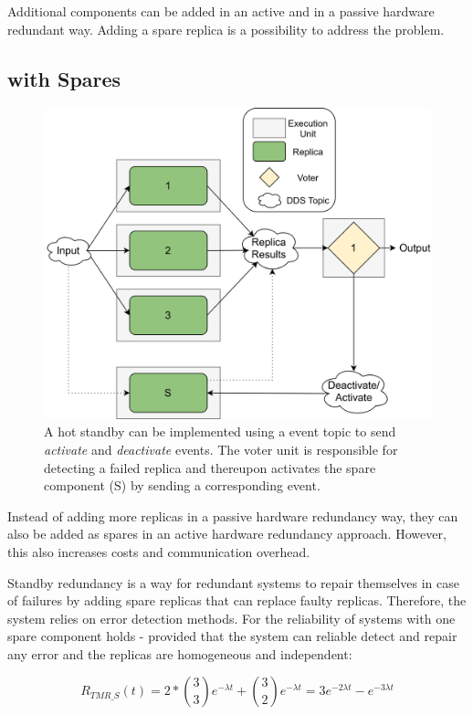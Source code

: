 Additional components can be added in an active and in a passive hardware redundant way.
Adding a spare replica is a possibility to address the \ChallengeWR problem.

\subsection{ with Spares}
\begin{figure}[!hb]
	\centering
	\includegraphics[width=0.8\linewidth]{images/TMRWithSparesDDS}
	\caption{A hot standby can be implemented using a  event topic to send \textit{activate} and \textit{deactivate} events. The voter unit is responsible for detecting a failed replica and thereupon activates the spare component (S) by sending a corresponding event.}
	\label{fig:TMRWithSparesDDS}
\end{figure}

Instead of adding more replicas in a passive hardware redundancy way, they can also be added as spares in an active hardware redundancy approach.
However, this also increases costs and communication overhead.

Standby redundancy is a way for redundant systems to repair themselves in case of failures by adding spare replicas that can replace faulty replicas.
Therefore, the system relies on error detection methods.
For the reliability of  systems with one spare component holds - provided that the system can reliable detect and repair any error and the replicas are homogeneous and independent:

\begin{equation}
R_{TMR\_S}(t) = 2 * {3 \choose 3} e^{-\lambda t} + {3 \choose 2} e^{-\lambda t}
 = 3e^{-2 \lambda t} - e^{-3 \lambda t}
\end{equation}

